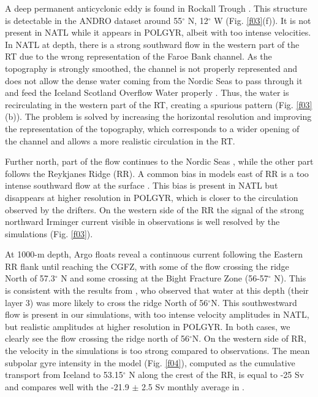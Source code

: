 \documentclass[os, manuscript]{copernicus}
\begin{document}
A deep permanent anticyclonic eddy is found in Rockall Trough \citep{fischer2018,smilenova,lecorre2019}. This structure is detectable in the ANDRO dataset around 55$^{\circ}$ N, 12$^{\circ}$ W (Fig. \ref{f03}(f)). It is not present in NATL while it appears in POLGYR, albeit with too intense velocities. In NATL at depth, there is a strong southward flow in the western part of the RT due to the wrong representation of the Faroe Bank channel. As the topography is strongly smoothed, the channel is not properly represented and does not allow the dense water coming from the Nordic Seas to pass through it and feed the Iceland Scotland Overflow Water properly \citep{hansen2016,kanzow2014}. Thus, the water is recirculating in the western part of the RT, creating a spurious pattern (Fig. \ref{f03}(b)). The problem is solved by increasing the horizontal resolution and improving the representation of the topography, which corresponds to a wider opening of the channel and allows a more realistic circulation in the RT. 

Further north, part of the flow continues to the Nordic Seas \citep{rossby2012}, while the other part follows the Reykjanes Ridge (RR). A common bias in models east of RR is a too intense southward flow at the surface \citep{treguier2005}. This bias is present in NATL but disappears at higher resolution in POLGYR, which is closer to the circulation observed by the drifters. On the western side of the RR the signal of the strong northward Irminger current visible in observations is well resolved by the simulations (Fig. \ref{f03}). 

At 1000-m depth, Argo floats reveal a continuous current following the Eastern RR flank until reaching the CGFZ, with some of the flow crossing the ridge North of 57.3$^{\circ}$ N and some crossing at the Bight Fracture Zone (56-57$^{\circ}$ N). This is consistent with the results from \citet{petit2018}, who observed that water at this depth (their layer 3) was more likely to cross the ridge North of 56$^{\circ}$N. This southwestward flow is present in our simulations, with too intense velocity amplitudes in NATL, but realistic amplitudes at higher resolution in POLGYR. In both cases, we clearly see the flow crossing the ridge north of 56$^{\circ}$N. On the western side of RR, the velocity in the simulations is too strong compared to observations.
The mean subpolar gyre intensity in the model (Fig. \ref{f04}), computed as the cumulative transport from Iceland to 53.15$^{\circ}$ N along the crest of the RR, is equal to -25 Sv and compares well with the -21.9 $\pm$ 2.5 Sv monthly average in \citet{petit2018}.  
\end{document}
